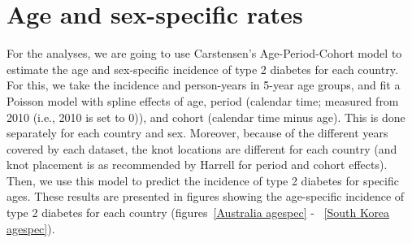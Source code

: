 \documentclass[11pt]{article}
\begin{document}
\section{Age and sex-specific rates}
\label{asrsec}

For the analyses, we are going to use Carstensen's Age-Period-Cohort model \cite{CarstensenSTATMED2007}
to estimate the age and sex-specific incidence of type 2 diabetes for each country. For this, 
we take the incidence and person-years in 5-year age groups, and fit a Poisson model with spline effects
of age, period (calendar time; measured from 2010 (i.e., 2010 is set to 0)), and cohort (calendar time minus age). 
This is done separately for each country and sex. Moreover, because of the different years covered by each dataset,
the knot locations are different for each country (and knot placement is as recommended by Harrell \cite{Harrell2001Springer} 
for period and cohort effects).
Then, we use this model to predict the incidence of type 2 diabetes
for specific ages. These results are presented in figures showing the age-specific
incidence of type 2 diabetes for each country (figures~\ref{Australia agespec} - ~\ref{South Korea agespec}).
\end{document}
